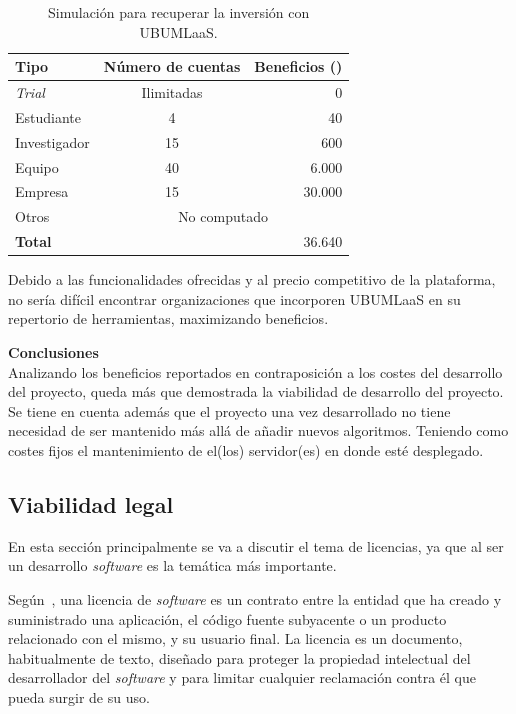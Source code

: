 \begin{table}[H]
\centering
\begin{tabular}{lcr}
	\toprule
	\textbf{Tipo}     & \textbf{Número de cuentas} & \textbf{Beneficios (\officialeuro)}\\
	\midrule
	\textit{Trial}        & Ilimitadas & 0 \\
	Estudiante   & 4 & 40 \\
	Investigador  & 15 & 600 \\
	Equipo  & 40 & 6.000 \\
	Empresa & 15 & 30.000 \\
	Otros & \multicolumn{2}{c}{No computado} \\
	\midrule
	\textbf{Total} &&36.640 \\
	\bottomrule
\end{tabular}
\caption{Simulación para recuperar la inversión con UBUMLaaS.}\label{tab:simulacion-clientes}
\end{table}

Debido a las funcionalidades ofrecidas y al precio competitivo de la plataforma, no sería difícil encontrar organizaciones que incorporen UBUMLaaS en su repertorio de herramientas, maximizando beneficios.

\textbf{Conclusiones}\\
Analizando los beneficios reportados en contraposición a los costes del desarrollo del proyecto, queda más que demostrada la viabilidad de desarrollo del proyecto. Se tiene en cuenta además que el proyecto una vez desarrollado no tiene necesidad de ser mantenido más allá de añadir nuevos algoritmos. Teniendo como costes fijos el mantenimiento de el(los) servidor(es) en donde esté desplegado.

\subsection{Viabilidad legal}

En esta sección principalmente se va a discutir el tema de licencias, ya que al ser un desarrollo \textit{software} es la temática más importante.

Según~\cite{softwareLicense}, una licencia de \textit{software} es un contrato entre la entidad que ha creado y suministrado una aplicación, el código fuente subyacente o un producto relacionado con el mismo, y su usuario final.  La licencia es un documento, habitualmente de texto, diseñado para proteger la propiedad intelectual del desarrollador del \textit{software} y para limitar cualquier reclamación contra él que pueda surgir de su uso.

